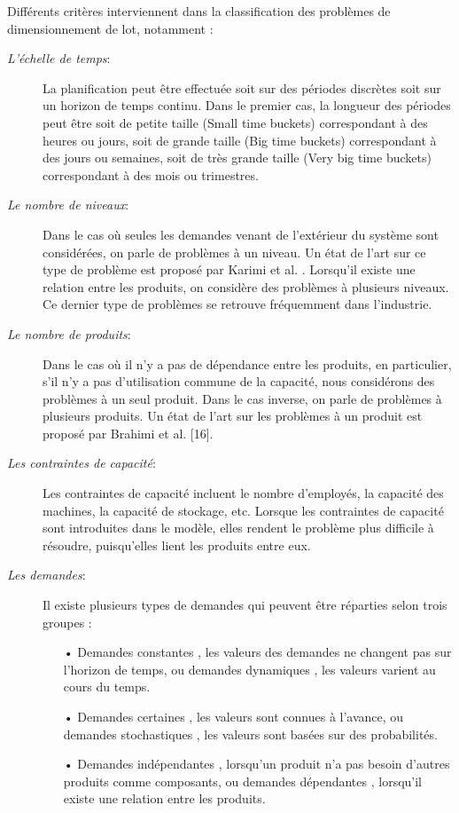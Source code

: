 \documentclass[12pt,a4paper]{article}
\begin{document}
Différents critères interviennent dans la classification des problèmes de dimensionnement de lot, notamment : 
\begin{description}
	\item[\textsl{L'échelle de temps}:] La planification peut être effectuée soit sur des périodes discrètes soit sur un horizon de temps continu. Dans le premier cas, la longueur des périodes peut
être soit de petite taille (Small time buckets) correspondant à des heures ou jours, soit de grande taille (Big time buckets) correspondant à des jours ou semaines, soit de très grande taille (Very big time buckets) correspondant à des mois ou trimestres.

	\item[\textsl{Le nombre de niveaux}:] Dans le cas où seules les demandes venant de l'extérieur du système sont considérées, on parle de problèmes à un niveau. Un état de l'art sur ce type de problème est proposé par Karimi et al. \cite{karimi} . Lorsqu'il existe une relation entre les produits, on considère des problèmes à plusieurs niveaux. Ce dernier type de problèmes se retrouve fréquemment dans l'industrie.

	\item[\textsl{Le nombre de produits}:] Dans le cas où il n'y a pas de dépendance entre les produits, en particulier, s'il n'y a pas d'utilisation commune de la capacité, nous considérons des problèmes à un seul produit. Dans le cas inverse, on parle de problèmes à plusieurs produits. Un état de l'art sur les problèmes à un produit est proposé par Brahimi et al. [16].

	\item[\textsl{Les contraintes de capacité}:] Les contraintes de capacité incluent le nombre d'employés, la capacité des machines, la capacité de stockage, etc. Lorsque les contraintes de capacité sont
introduites dans le modèle, elles rendent le problème plus difficile à résoudre,
puisqu'elles lient les produits entre eux.

	\item[\textsl{Les demandes}:] Il existe plusieurs types de demandes qui peuvent être réparties selon trois
groupes :
	\begin{itemize}
		\item[•] Demandes constantes , les valeurs des demandes ne changent pas sur l'horizon de temps, ou demandes dynamiques , les valeurs varient au cours du temps.
		\item[•] Demandes certaines , les valeurs sont connues à l'avance, ou demandes stochastiques , les valeurs sont basées sur des probabilités.
		\item[•] Demandes indépendantes , lorsqu'un produit n'a pas besoin d'autres produits comme composants, ou demandes dépendantes , lorsqu'il existe une relation
entre les produits.
	\end{itemize}


\end{description}
\end{document}
